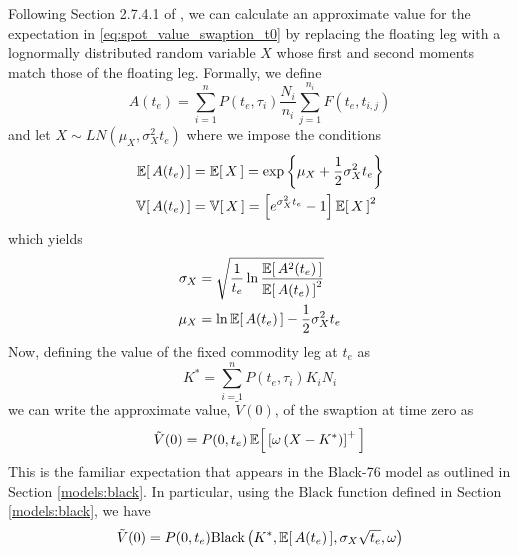 Following Section 2.7.4.1 of \cite{Clark_2014}, we can calculate an approximate value for the expectation in \eqref{eq:spot_value_swaption_t0} by replacing the floating leg with a lognormally distributed random variable $X$ whose first and second moments match those of the floating leg. Formally, we define
\begin{equation}
A(t_e) = \sum_{i=1}^{n} P(t_e, \tau_i) \frac{N_i}{n_i} \sum_{j=1}^{n_i} F(t_e, t_{i,j})
\end{equation}
and let $X \sim LN(\mu_X, \sigma^2_X t_e)$ where we impose the conditions
\begingroup
\addtolength{\jot}{0.5em}
\begin{align}
\Ex{A(t_e)} &= \Ex{X} = \exp \left\{ \mu_X + \frac{1}{2} \sigma^2_X t_e \right\} \\
\Var{A(t_e)} &= \Var{X} = \left[ e^{\sigma^2_X t_e} - 1 \right] \Ex{X}^2
\end{align}
\endgroup
which yields
\begingroup
\addtolength{\jot}{0.5em}
\begin{align}
\sigma_X &= \sqrt{ \frac{1}{t_e} \ln \frac{\Ex{A^2(t_e)}}{\Ex{A(t_e)}^2} } \label{eq:spot_sigma_x} \\
\mu_X &= \ln \Ex{A(t_e)} - \frac{1}{2} \sigma^2_X t_e \label{eq:spot_mu_x}
\end{align}
\endgroup
Now, defining the value of the fixed commodity leg at $t_e$ as
\begin{equation}
K^{*} = \sum_{i=1}^{n} P(t_e, \tau_i) K_i N_i
\end{equation}
we can write the approximate value, $\tilde{V}(0)$, of the swaption at time zero as
\begin{equation}
\tilde{V}(0) = P(0, t_e) \Ex{\left[ \omega \left( X - K^{*} \right) \right]^{+}}
\end{equation}
This is the familiar expectation that appears in the Black-76 model as outlined in Section \ref{models:black}. In particular, using the $\text{Black}$ function defined in Section \ref{models:black}, we have
\begin{equation}
\tilde{V}(0) = P(0, t_e) \text{Black} \left( K^{*}, \Ex{A(t_e)}, \sigma_X \sqrt{t_e}, \omega \right)
\end{equation}

